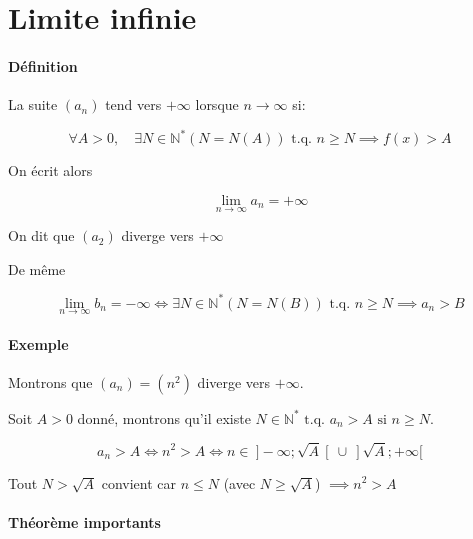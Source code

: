 \documentclass[
    11pt,
    a4paper,
    oneside,
    headinlcude, footinclude,
    twoside,
]{report}
\newcommand{\tq}[0]{\textrm{ t.q. }}
\begin{document}
\section{Limite infinie}
\label{sec:limite_infinie}

\paragraph{Définition}
La suite $(a_{n})$ tend vers $+ \infty$ lorsque $n \to \infty$ si:

$$\forall A > 0, \quad \exists N \in \mathbb{N}^{*} (N = N(A)) \tq n \geq N
\implies f(x) > A$$

On écrit alors 

$$ \lim_{n \to \infty} a_{n} = + \infty$$

On dit que $(a_{2})$ diverge vers $+ \infty$ 

De même 

$$ \lim_{n \to \infty} b_{n} = - \infty \iff \exists N \in \mathbb{N}^{*} (N =
N(B)) \tq n \geq N \implies a_{n} > B$$

\paragraph{Exemple}
\label{par:exemple}

Montrons que $(a_{n}) = (n^{2})$  diverge vers $+ \infty$.

Soit $A > 0$ donné, montrons qu'il existe $N \in \mathbb{N}^{*} \tq a_{n} > A
\textrm{ si } n \geq N $.

$$a_{n} > A \iff n ^{2} > A \iff n \in \ ]-\infty; \sqrt A [ \ \cup \ ] \sqrt
A; + \infty[ $$

Tout $N > \sqrt A$ convient car $n \leq N$ (avec $N \geq \sqrt A$) $\implies
n^{2} > A$


\paragraph{Théorème importants}
\label{par:theoreme_importants}
\end{document}
